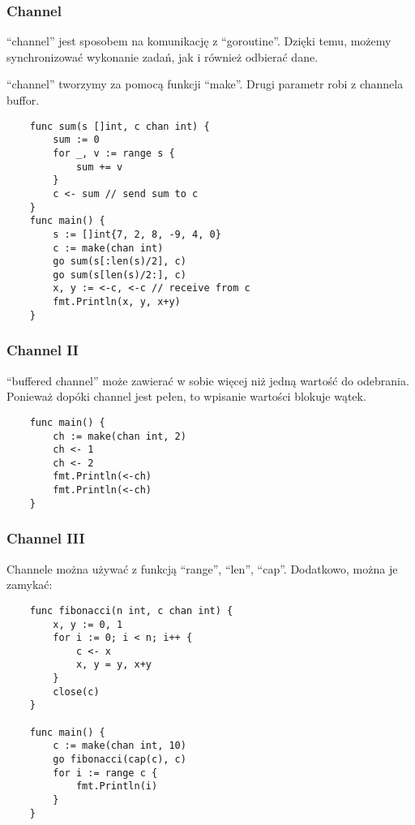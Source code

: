\documentclass[10pt]{beamer}
\newcommand{\quotes}[1]{``#1''}
\begin{document}
\begin{frame}[fragile]
    \frametitle{Channel}
    \quotes{channel} jest sposobem na komunikację z \quotes{goroutine}. Dzięki temu, możemy synchronizować 
    wykonanie zadań, jak i również odbierać dane. 

    \quotes{channel} tworzymy za pomocą funkcji \quotes{make}. Drugi parametr robi z channela buffor.

    \begin{verbatim}
    func sum(s []int, c chan int) {
        sum := 0
        for _, v := range s {
            sum += v
        }
        c <- sum // send sum to c
    }
    func main() {
        s := []int{7, 2, 8, -9, 4, 0}
        c := make(chan int)
        go sum(s[:len(s)/2], c)
        go sum(s[len(s)/2:], c)
        x, y := <-c, <-c // receive from c
        fmt.Println(x, y, x+y)
    }
    \end{verbatim}
\end{frame}

\begin{frame}[fragile]
    \frametitle{Channel II}
    \quotes{buffered channel} może zawierać w sobie więcej niż jedną wartość do odebrania.
    Ponieważ dopóki channel jest pełen, to wpisanie wartości blokuje wątek.

    \begin{verbatim}
    func main() {
        ch := make(chan int, 2)
        ch <- 1
        ch <- 2
        fmt.Println(<-ch)
        fmt.Println(<-ch)
    }
    \end{verbatim}
\end{frame}

\begin{frame}[fragile]
    \frametitle{Channel III}
    Channele można używać z funkcją \quotes{range}, \quotes{len}, \quotes{cap}.
    Dodatkowo, można je zamykać:

    \begin{verbatim}
    func fibonacci(n int, c chan int) {
        x, y := 0, 1
        for i := 0; i < n; i++ {
            c <- x
            x, y = y, x+y
        }
        close(c)
    }
    
    func main() {
        c := make(chan int, 10)
        go fibonacci(cap(c), c)
        for i := range c {
            fmt.Println(i)
        }
    }
    \end{verbatim}
\end{frame}
\end{document}
